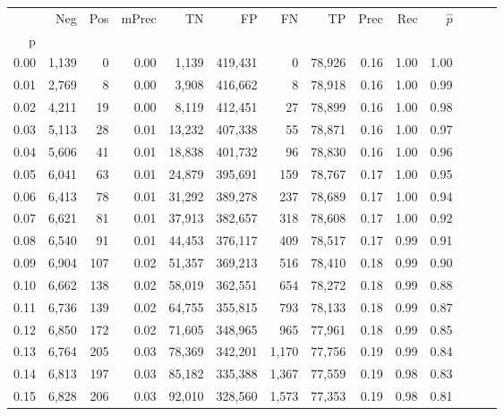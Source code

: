 \begin{tabular}{rrrrrrrrrrrrrr}
\toprule
{} &    Neg &    Pos & mPrec &       TN &       FP &      FN &      TP &  Prec &   Rec & $\hat{p}$ \\
p    &        &        &       &          &          &         &         &       &       &           \\
\midrule
0.00 &  1,139 &      0 &  0.00 &    1,139 &  419,431 &       0 &  78,926 &  0.16 &  1.00 &      1.00 \\
0.01 &  2,769 &      8 &  0.00 &    3,908 &  416,662 &       8 &  78,918 &  0.16 &  1.00 &      0.99 \\
0.02 &  4,211 &     19 &  0.00 &    8,119 &  412,451 &      27 &  78,899 &  0.16 &  1.00 &      0.98 \\
0.03 &  5,113 &     28 &  0.01 &   13,232 &  407,338 &      55 &  78,871 &  0.16 &  1.00 &      0.97 \\
0.04 &  5,606 &     41 &  0.01 &   18,838 &  401,732 &      96 &  78,830 &  0.16 &  1.00 &      0.96 \\
0.05 &  6,041 &     63 &  0.01 &   24,879 &  395,691 &     159 &  78,767 &  0.17 &  1.00 &      0.95 \\
0.06 &  6,413 &     78 &  0.01 &   31,292 &  389,278 &     237 &  78,689 &  0.17 &  1.00 &      0.94 \\
0.07 &  6,621 &     81 &  0.01 &   37,913 &  382,657 &     318 &  78,608 &  0.17 &  1.00 &      0.92 \\
0.08 &  6,540 &     91 &  0.01 &   44,453 &  376,117 &     409 &  78,517 &  0.17 &  0.99 &      0.91 \\
0.09 &  6,904 &    107 &  0.02 &   51,357 &  369,213 &     516 &  78,410 &  0.18 &  0.99 &      0.90 \\
0.10 &  6,662 &    138 &  0.02 &   58,019 &  362,551 &     654 &  78,272 &  0.18 &  0.99 &      0.88 \\
0.11 &  6,736 &    139 &  0.02 &   64,755 &  355,815 &     793 &  78,133 &  0.18 &  0.99 &      0.87 \\
0.12 &  6,850 &    172 &  0.02 &   71,605 &  348,965 &     965 &  77,961 &  0.18 &  0.99 &      0.85 \\
0.13 &  6,764 &    205 &  0.03 &   78,369 &  342,201 &   1,170 &  77,756 &  0.19 &  0.99 &      0.84 \\
0.14 &  6,813 &    197 &  0.03 &   85,182 &  335,388 &   1,367 &  77,559 &  0.19 &  0.98 &      0.83 \\
0.15 &  6,828 &    206 &  0.03 &   92,010 &  328,560 &   1,573 &  77,353 &  0.19 &  0.98 &      0.81 \\

\end{tabular}
